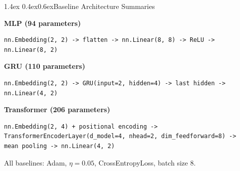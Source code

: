 \documentclass[11pt,a4paper]{article}
\makeatletter
\renewcommand\section{\@startsection{section}{1}{\z@}%
  {1.4ex \@plus 0.4ex}{0.6ex}{\normalfont\large\bfseries}}
\makeatother
\begin{document}
\section{Baseline Architecture Summaries}
\label{app:baselines}

\textbf{MLP (94 parameters)}
\begin{lstlisting}
nn.Embedding(2, 2) -> flatten -> nn.Linear(8, 8) -> ReLU -> nn.Linear(8, 2)
\end{lstlisting}

\textbf{GRU (110 parameters)}
\begin{lstlisting}
nn.Embedding(2, 2) -> GRU(input=2, hidden=4) -> last hidden -> nn.Linear(4, 2)
\end{lstlisting}

\textbf{Transformer (206 parameters)}
\begin{lstlisting}
nn.Embedding(2, 4) + positional encoding ->
TransformerEncoderLayer(d_model=4, nhead=2, dim_feedforward=8) ->
mean pooling -> nn.Linear(4, 2)
\end{lstlisting}

All baselines: Adam, $\eta = 0.05$, CrossEntropyLoss, batch size 8.
\end{document}
